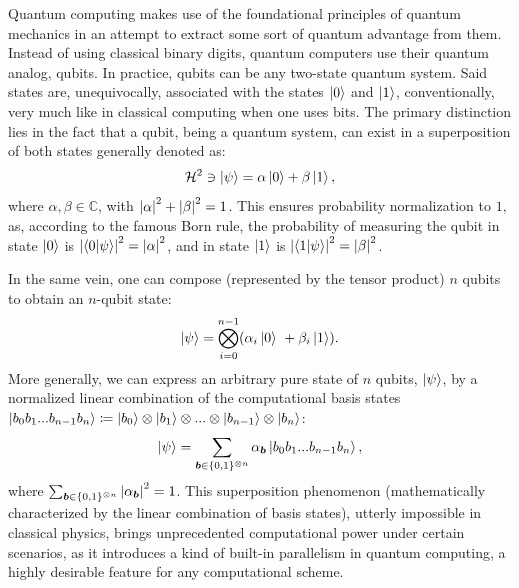 Quantum computing makes use of the foundational principles of quantum mechanics in an attempt to extract some sort of quantum advantage from them. Instead of using classical binary digits, quantum computers use their quantum analog, qubits. In practice, qubits can be any two-state quantum system. Said states are, unequivocally, associated with the states $\ket{0}$ and $\ket{1}$, conventionally, very much like in classical computing when one uses bits. The primary distinction lies in the fact that a qubit, being a quantum system, can exist in a superposition of both states generally denoted as:
\begin{equation}
  \mathcal{H}^2 \ni \ket{\psi} = \alpha \ket{0} + \beta \ket{1},
\end{equation}
where $\alpha, \beta \in \mathbb{C}$, with $\abs{\alpha}^2 + \abs{\beta}^2 = 1$. This ensures probability normalization to $1$, as, according to the famous Born rule, the probability of measuring the qubit in state $\ket{0}$ is $\abs{\bra{0}\ket{\psi}}^2 = \abs{\alpha}^2$, and in state $\ket{1}$ is $\abs{\bra{1}\ket{\psi}}^2 = \abs{\beta}^2$.

In the same vein, one can compose (represented by the tensor product) $n$ qubits to obtain an $n$-qubit state:
\begin{equation}\label{eq:n_qubit_state}
  \ket{\psi}=\bigotimes_{i=0}^{n-1}(\alpha_{i}\ket{0}\ +\beta_{i}\ket{1}).
\end{equation}
More generally, we can express an arbitrary pure state of $n$ qubits, $\ket{\psi}$, by a normalized linear combination of the computational basis states $\ket{b_0 b_1 ... b_{n-1} b_n} \coloneq \ket{b_0} \otimes \ket{b_1} \otimes ... \otimes \ket{b_{n-1}} \otimes \ket{b_n}$:
\begin{equation}\label{eq:general_n_qubit_state}
  \ket{\psi} = \sum_{\boldsymbol{b} \in \{0, 1\}^{\otimes n}} \alpha_{\boldsymbol{b}} \ket{b_0 b_1 ... b_{n-1} b_n},
\end{equation}
where $\sum_{\boldsymbol{b} \in \{0, 1\}^{\otimes n}} \abs{\alpha_{\boldsymbol{b}}}^2 = 1$. This superposition phenomenon (mathematically characterized by the linear combination of basis states), utterly impossible in classical physics, brings unprecedented computational power under certain scenarios, as it introduces a kind of built-in parallelism in quantum computing, a highly desirable feature for any computational scheme.

